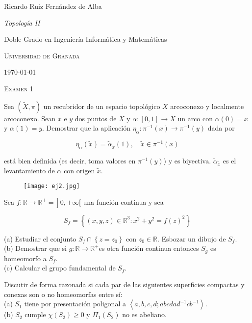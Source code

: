 \documentclass[
  a4paper,
  spanish,
  12pt,
]{scrartcl}
\begin{document}
\begin{flushright}
  Ricardo Ruiz Fernández de Alba\vspace{.5em}

  \textit{Topología II}

  Doble Grado en Ingeniería Informática y Matemáticas

  \textsc{Universidad de Granada}\vspace{.5em}

  \today\vspace{.5em}
\end{flushright}

\begin{flushleft}
  \scshape\Large Examen 1
\end{flushleft}

\begin{ejer}
Sea $(\tilde{X}, \pi)$ un recubridor de un espacio topológico $X$ arcoconexo y 
localmente arcoconexo. Sean $x$ e $y$ dos puntos de $X$ y $\alpha: [0, 1] \rightarrow X$ un arco con
$\alpha(0) = x$ y $\alpha(1) = y$. Demostrar que la aplicación $\eta_\alpha: \pi^{-1}(x) \rightarrow \pi^{-1}(y)$ dada por

$$
\eta_\alpha(\tilde{x}) = \tilde{\alpha}_{\tilde{x}}(1), \quad \tilde{x} \in \pi^{-1}(x)
$$

está bien definida (es decir, toma valores en $\pi^{-1}(y)$) y es biyectiva. $\tilde{\alpha}_{\tilde{x}}$ es
el levantamiento de $\alpha$ con origen $\tilde{x}$.
\end{ejer}


\begin{figure}[H]
    \texttt{[image: ej2.jpg]} 
\end{figure}

\begin{ejer}
Sea $\left.f: \mathbb{R} \rightarrow \mathbb{R}^{+}=\right] 0,+\infty[$ una función continua y sea
	
$$
S_{f}=\left\{(x, y, z) \in \mathbb{R}^{3}: x^{2}+y^{2}=f(z)^{2}\right\}
$$
	
(a) Estudiar el conjunto $S_{f} \cap\left\{z=z_{0}\right\}$ con $z_{0} \in \mathbb{R}$. Esbozar un dibujo de $S_{f}$.\\
(b) Demostrar que si $g: \mathbb{R} \rightarrow \mathbb{R}^{+}$es otra función continua entonces $S_{g}$ es homeomorfo a $S_{f}$.\\
(c) Calcular el grupo fundamental de $S_{f}$.\\
	
\end{ejer}


\begin{ejer}
Discutir de forma razonada si cada par de las siguientes superficies compactas y conexas son o no homeomorfas entre sí:\\
(a) $S_{1}$ tiene por presentación poligonal a $\left\langle a, b, c, d ; a b c d a d^{-1} c b^{-1}\right\rangle$.\\
(b) $S_{2}$ cumple $\chi\left(S_{2}\right) \geq 0$ y $\Pi_{1}\left(S_{2}\right)$ no es abeliano.\\
\end{ejer}
	
\end{document}

